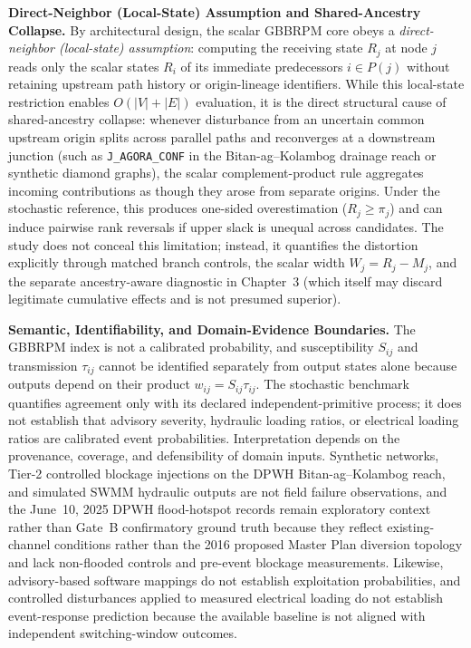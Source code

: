\textbf{Direct-Neighbor (Local-State) Assumption and Shared-Ancestry
Collapse.} By architectural design, the scalar GBBRPM core obeys a
\emph{direct-neighbor (local-state) assumption}: computing the receiving
state $R_j$ at node $j$ reads only the scalar states $R_i$ of its immediate
predecessors $i \in P(j)$ without retaining upstream path history or
origin-lineage identifiers. While this local-state restriction enables
$O(|V|+|E|)$ evaluation, it is the direct structural cause of shared-ancestry
collapse: whenever disturbance from an uncertain common upstream origin
splits across parallel paths and reconverges at a downstream junction (such
as \texttt{J\_AGORA\_CONF} in the Bitan-ag--Kolambog drainage reach or
synthetic diamond graphs), the scalar complement-product rule aggregates
incoming contributions as though they arose from separate origins. Under the
stochastic reference, this produces one-sided overestimation ($R_j \ge \pi_j$)
and can induce pairwise rank reversals if upper slack is unequal across
candidates. The study does not conceal this limitation; instead, it
quantifies the distortion explicitly through matched branch controls, the
scalar width $W_j = R_j - M_j$, and the separate ancestry-aware diagnostic in
Chapter~3 (which itself may discard legitimate cumulative effects and is not
presumed superior).

\textbf{Semantic, Identifiability, and Domain-Evidence Boundaries.} The
GBBRPM index is not a calibrated probability, and susceptibility $S_{ij}$ and
transmission $\tau_{ij}$ cannot be identified separately from output states
alone because outputs depend on their product $w_{ij} = S_{ij}\tau_{ij}$. The
stochastic benchmark quantifies agreement only with its declared
independent-primitive process; it does not establish that advisory severity,
hydraulic loading ratios, or electrical loading ratios are calibrated event
probabilities. Interpretation depends on the provenance, coverage, and
defensibility of domain inputs. Synthetic networks, Tier-2 controlled
blockage injections on the DPWH Bitan-ag--Kolambog reach, and simulated SWMM
hydraulic outputs are not field failure observations, and the June~10, 2025
DPWH flood-hotspot records remain exploratory context rather than Gate~B
confirmatory ground truth because they reflect existing-channel conditions
rather than the 2016 proposed Master Plan diversion topology and lack
non-flooded controls and pre-event blockage measurements. Likewise,
advisory-based software mappings do not establish exploitation probabilities,
and controlled disturbances applied to measured electrical loading do not
establish event-response prediction because the available baseline is not
aligned with independent switching-window outcomes.

